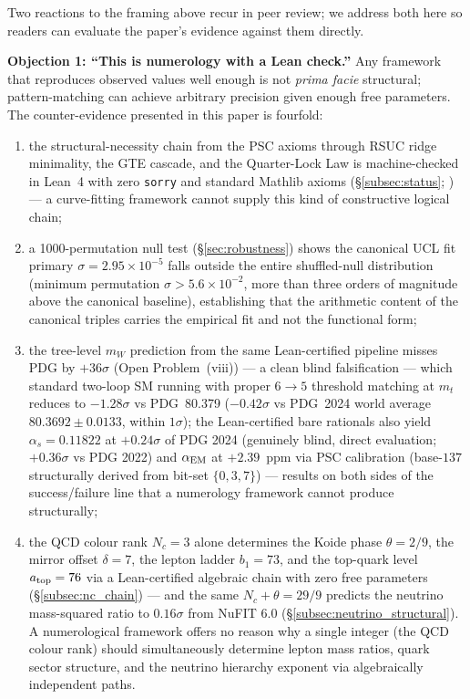 \documentclass[11pt]{article}
\theoremstyle{remark}
\begin{document}
\begin{tcolorbox}[colback=gray!5,colframe=gray!55!black,
  title={\textbf{Two Common Objections, Addressed Up Front}},
  fonttitle=\bfseries,left=5pt,right=5pt,top=4pt,bottom=4pt,breakable]
\small
Two reactions to the framing above recur in peer review; we address both here so readers can evaluate the paper's evidence against them directly.

\smallskip
\noindent\textbf{Objection 1: ``This is numerology with a Lean check.''}  Any framework that reproduces observed values well enough is not \emph{prima facie} structural; pattern-matching can achieve arbitrary precision given enough free parameters.  The counter-evidence presented in this paper is fourfold:
\begin{enumerate}[label=(\alph*),leftmargin=1.4em,itemsep=0.05em,topsep=0.2em]
  \item the structural-necessity chain from the PSC axioms through RSUC ridge minimality, the GTE cascade, and the Quarter-Lock Law is machine-checked in Lean~4 with zero \texttt{sorry} and standard Mathlib axioms (\S\ref{subsec:status}; \cite{ugp-lean,SpivackUGPFormalization}) --- a curve-fitting framework cannot supply this kind of constructive logical chain;
  \item a 1000-permutation null test (\S\ref{sec:robustness}) shows the canonical UCL fit primary $\sigma = 2.95\times10^{-5}$ falls outside the entire shuffled-null distribution (minimum permutation $\sigma > 5.6\times10^{-2}$, more than three orders of magnitude above the canonical baseline), establishing that the arithmetic content of the canonical triples carries the empirical fit and not the functional form;
  \item the tree-level $m_W$ prediction from the same Lean-certified pipeline misses PDG by $+36\sigma$ (Open Problem~(viii)) --- a clean blind falsification --- which standard two-loop SM running with proper $6{\to}5$ threshold matching at $m_t$ reduces to $-1.28\sigma$ vs PDG~80.379 ($-0.42\sigma$ vs PDG~2024 world average $80.3692 \pm 0.0133$, within $1\sigma$); the Lean-certified bare rationals also yield $\alpha_s = 0.11822$ at $+0.24\sigma$ of PDG 2024 (genuinely blind, direct evaluation; $+0.36\sigma$ vs PDG 2022) and $\alpha_{\rm EM}$ at $+2.39$~ppm via PSC calibration (base-$137$ structurally derived from bit-set $\{0,3,7\}$) --- results on both sides of the success/failure line that a numerology framework cannot produce structurally;
  \item the QCD colour rank $N_c = 3$ alone determines the Koide phase $\theta = 2/9$, the mirror offset $\delta = 7$, the lepton ladder $b_1 = 73$, and the top-quark level $a_{\rm top} = 76$ via a Lean-certified algebraic chain with zero free parameters (\S\ref{subsec:nc_chain}) --- and the same $N_c + \theta = 29/9$ predicts the neutrino mass-squared ratio to $0.16\sigma$ from NuFIT 6.0 (\S\ref{subsec:neutrino_structural}). A numerological framework offers no reason why a single integer (the QCD colour rank) should simultaneously determine lepton mass ratios, quark sector structure, and the neutrino hierarchy exponent via algebraically independent paths.
\end{enumerate}


\end{tcolorbox}
\end{document}
